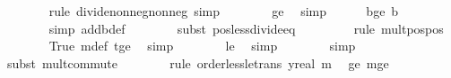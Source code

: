 \begin{isabellebody}
\ \ \ \ \ \ \isamarkupfalse%
\ {\isacharparenleft}{\kern0pt}rule\ divide{\isacharunderscore}{\kern0pt}nonneg{\isacharunderscore}{\kern0pt}nonneg{\isacharcomma}{\kern0pt}\ simp{\isacharparenright}{\kern0pt}\isanewline
\ \ \ \ \ \ \isamarkupfalse%
\ {\isasymdelta}{\isacharprime}{\kern0pt}{\isacharunderscore}{\kern0pt}ge{\isacharunderscore}{\kern0pt}{}\ \isamarkupfalse%
\ simp\isanewline
\ \ \ \ \isamarkupfalse%
\ b{\isacharunderscore}{\kern0pt}ge{\isacharunderscore}{\kern0pt}{}{\isacharcolon}{\kern0pt}\ {\isachardoublequoteopen}b\ {\isachargreater}{\kern0pt}\ {}{\isachardoublequoteclose}\ \isanewline
\ \ \ \ \ \ \isamarkupfalse%
\ {\isacharparenleft}{\kern0pt}simp\ add{\isacharcolon}{\kern0pt}b{\isacharunderscore}{\kern0pt}def{\isacharparenright}{\kern0pt}\isanewline
\ \ \ \ \ \ \isamarkupfalse%
\ {\isacharparenleft}{\kern0pt}subst\ pos{\isacharunderscore}{\kern0pt}less{\isacharunderscore}{\kern0pt}divide{\isacharunderscore}{\kern0pt}eq{\isacharparenright}{\kern0pt}\isanewline
\ \ \ \ \ \ \ \isamarkupfalse%
\ {\isacharparenleft}{\kern0pt}rule\ mult{\isacharunderscore}{\kern0pt}pos{\isacharunderscore}{\kern0pt}pos{\isacharparenright}{\kern0pt}\isanewline
\ \ \ \ \ \ \isamarkupfalse%
\ True\ m{\isacharunderscore}{\kern0pt}def\ t{\isacharunderscore}{\kern0pt}ge{\isacharunderscore}{\kern0pt}{}\ \isamarkupfalse%
\ simp\isanewline
\ \ \ \ \ \ \isamarkupfalse%
\ {\isasymdelta}{\isacharprime}{\kern0pt}{\isacharunderscore}{\kern0pt}le{\isacharunderscore}{\kern0pt}{}\ \isamarkupfalse%
\ simp\isanewline
\ \ \ \ \ \ \isamarkupfalse%
\ simp\isanewline
\ \ \ \ \ \ \isamarkupfalse%
\ {\isacharparenleft}{\kern0pt}subst\ mult{\isachardot}{\kern0pt}commute{\isacharparenright}{\kern0pt}\isanewline
\ \ \ \ \ \ \isamarkupfalse%
\ {\isacharparenleft}{\kern0pt}rule\ order{\isacharunderscore}{\kern0pt}less{\isacharunderscore}{\kern0pt}le{\isacharunderscore}{\kern0pt}trans{\isacharbrackleft}{\kern0pt}\ y{\isacharequal}{\kern0pt}{\isachardoublequoteopen}real\ m{\isachardoublequoteclose}{\isacharbrackright}{\kern0pt}{\isacharparenright}{\kern0pt}\ \isamarkupfalse%
\ {\isasymdelta}{\isacharprime}{\kern0pt}{\isacharunderscore}{\kern0pt}ge{\isacharunderscore}{\kern0pt}{}\ m{\isacharunderscore}{\kern0pt}ge{\isacharunderscore}{\kern0pt}{}\ \isamarkupfalse%

\end{isabellebody}

